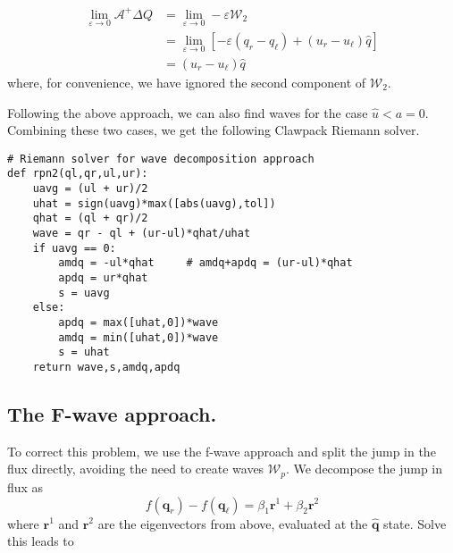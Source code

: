 \documentclass{article}
\begin{document}
\begin{align}
\lim_{\varepsilon \rightarrow 0} \mathcal A^+ \Delta Q
& = \lim_{\varepsilon \rightarrow 0} -\varepsilon \mathcal W_2 \\
& = \lim_{\varepsilon \rightarrow 0} \left[-\varepsilon(q_r - q_\ell) + (u_r - u_\ell) \widehat{q}\right] \\
& = (u_r - u_\ell) \widehat{q}
\end{align}
where, for convenience, we have ignored the second component of $\mathcal W_2$. 

Following the above approach, we can also find waves for the case $\widehat{u} < a = 0$.   Combining these two cases, we get the following Clawpack Riemann solver.  

\vspace{0.25cm}

\begin{minipage}{\textwidth}
\begin{verbatim}
# Riemann solver for wave decomposition approach
def rpn2(ql,qr,ul,ur):
    uavg = (ul + ur)/2        
    uhat = sign(uavg)*max([abs(uavg),tol])
    qhat = (ql + qr)/2
    wave = qr - ql + (ur-ul)*qhat/uhat
    if uavg == 0:
        amdq = -ul*qhat     # amdq+apdq = (ur-ul)*qhat
        apdq = ur*qhat
        s = uavg
    else:
        apdq = max([uhat,0])*wave
        amdq = min([uhat,0])*wave        
        s = uhat
    return wave,s,amdq,apdq
\end{verbatim}
\end{minipage}

\vspace{0.25cm}

\subsection{The F-wave approach.} To correct this problem, we use the f-wave approach and
split the jump in the flux directly, avoiding the need to create waves $\mathcal W_p$.  
We decompose the jump in flux as
\begin{equation}
f(\mathbf q_r) - f(\mathbf q_\ell) = \beta_1 \mathbf r^1 + \beta_2\mathbf r^2
\end{equation}
where $\mathbf r^1$ and $\mathbf r^2$ are the eigenvectors from above, evaluated at the $\widehat{\mathbf q}$ state.   Solve this leads to 
\end{document}
